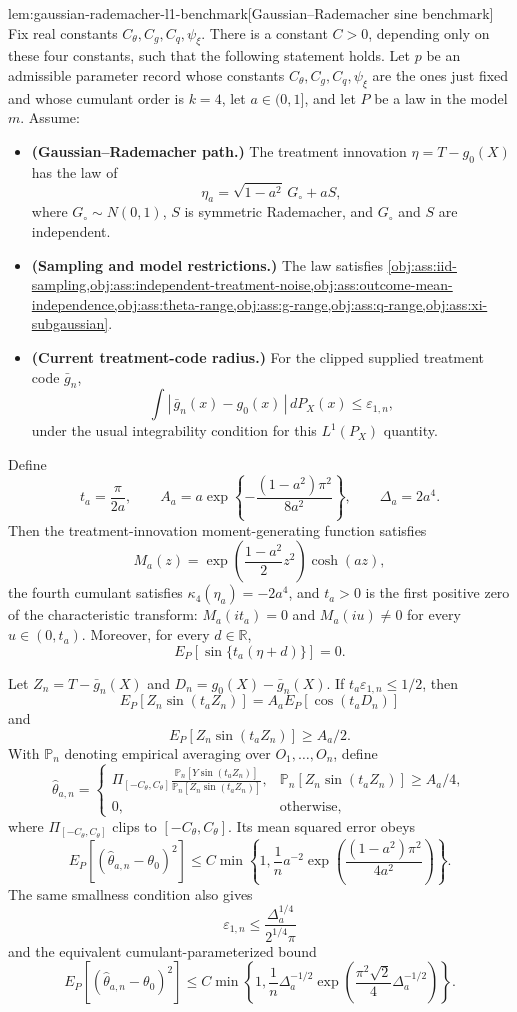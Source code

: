 \begin{lemmav}{lem:gaussian-rademacher-l1-benchmark}[Gaussian--Rademacher sine benchmark]
Fix real constants \(C_{\theta},C_g,C_q,\psi_{\xi}\).  There is a constant \(C>0\), depending only on these four constants, such that the following statement holds.  Let \(p\) be an admissible parameter record whose constants \(C_{\theta},C_g,C_q,\psi_{\xi}\) are the ones just fixed and whose cumulant order is \(k=4\), let \(a\in(0,1]\), and let \(P\) be a law in the model \(m\).  Assume:
\begin{itemize}
\item \textbf{(Gaussian--Rademacher path.)} The treatment innovation \(\eta=T-g_0(X)\) has the law of
\[
\eta_a=\sqrt{1-a^2}\,G_{\circ}+aS,
\]
where \(G_{\circ}\sim N(0,1)\), \(S\) is symmetric Rademacher, and \(G_{\circ}\) and \(S\) are independent.
\item \textbf{(Sampling and model restrictions.)} The law satisfies \cref{obj:ass:iid-sampling,obj:ass:independent-treatment-noise,obj:ass:outcome-mean-independence,obj:ass:theta-range,obj:ass:g-range,obj:ass:q-range,obj:ass:xi-subgaussian}.
\item \textbf{(Current treatment-code radius.)} For the clipped supplied treatment code \(\bar g_n\),
\[
\int |\,\bar g_n(x)-g_0(x)\,|\,dP_X(x)\le \varepsilon_{1,n},
\]
under the usual integrability condition for this \(L^1(P_X)\) quantity.
\end{itemize}
Define
\[
t_a=\frac{\pi}{2a},\qquad
A_a=a\exp\!\left\{-\frac{(1-a^2)\pi^2}{8a^2}\right\},\qquad
\Delta_a=2a^4.
\]
Then the treatment-innovation moment-generating function satisfies
\[
M_a(z)=\exp\!\left(\frac{1-a^2}{2}z^2\right)\cosh(az),
\]
the fourth cumulant satisfies \(\kappa_4(\eta_a)=-2a^4\), and \(t_a>0\) is the first positive zero of the characteristic transform: \(M_a(it_a)=0\) and \(M_a(iu)\ne0\) for every \(u\in(0,t_a)\).  Moreover, for every \(d\in\mathbb R\),
\[
E_P[\sin\{t_a(\eta+d)\}]=0.
\]

Let \(Z_n=T-\bar g_n(X)\) and \(D_n=g_0(X)-\bar g_n(X)\).  If \(t_a\varepsilon_{1,n}\le 1/2\), then
\[
E_P[Z_n\sin(t_aZ_n)]
=A_aE_P[\cos(t_aD_n)]
\]
and
\[
E_P[Z_n\sin(t_aZ_n)]\ge A_a/2.
\]
With \(\mathbb P_n\) denoting empirical averaging over \(O_1,\ldots,O_n\), define
\[
 \widehat\theta_{a,n}
 =
 \begin{cases}
 \displaystyle
 \Pi_{[-C_{\theta},C_{\theta}]}
 \frac{\mathbb P_n[Y\sin(t_aZ_n)]}
      {\mathbb P_n[Z_n\sin(t_aZ_n)]},
 &\displaystyle \mathbb P_n[Z_n\sin(t_aZ_n)]\ge A_a/4,\\[3mm]
 0,&\text{otherwise},
 \end{cases}
\]
where \(\Pi_{[-C_{\theta},C_{\theta}]}\) clips to \([-C_{\theta},C_{\theta}]\).  Its mean squared error obeys
\[
 E_P[(\widehat\theta_{a,n}-\theta_0)^2]
 \le
 C\min\!\left\{1,\frac1n a^{-2}
 \exp\!\left(\frac{(1-a^2)\pi^2}{4a^2}\right)\right\}.
\]
The same smallness condition also gives
\[
\varepsilon_{1,n}\le \frac{\Delta_a^{1/4}}{2^{1/4}\pi}
\]
and the equivalent cumulant-parameterized bound
\[
 E_P[(\widehat\theta_{a,n}-\theta_0)^2]
 \le
 C\min\!\left\{1,\frac1n\Delta_a^{-1/2}
 \exp\!\left(\frac{\pi^2\sqrt2}{4}\Delta_a^{-1/2}\right)\right\}.
\]
\end{lemmav}

